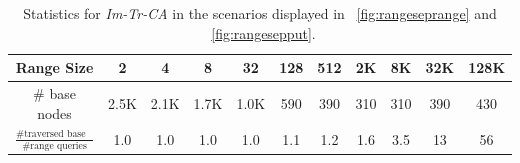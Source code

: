 \documentclass[a4paper,UKenglish]{oasics-v2016}
\begin{document}

 \begin{table}[h]%
  
   \caption{Statistics for \emph{Im-Tr-CA} in the scenarios displayed in \figurename~\ref{fig:rangeseprange} and \figurename~\ref{fig:rangesepput}.}
   \label{tab:nodestats}
   \begin{adjustbox}{max width=\textwidth}
      \begin{tabular}{c|cccccccccc} %
      Range Size  & 2 & 4 & 8 & 32 & 128 & 512 & 2K & 8K & 32K & 128K \\\hline
      \# base nodes & 2.5K & 2.1K & 1.7K & 1.0K & 590 & 390 & 310 & 310 & 390 & 430 \\ 
      $\frac{\text{\# traversed base nodes}}{\text{\# range queries}}$ & 1.0 & 1.0 & 1.0 & 1.0 & 1.1 & 1.2 & 1.6 & 3.5 & 13 & 56 \\ %
    \end{tabular}
  \end{adjustbox}
\end{table} 
\end{document}
